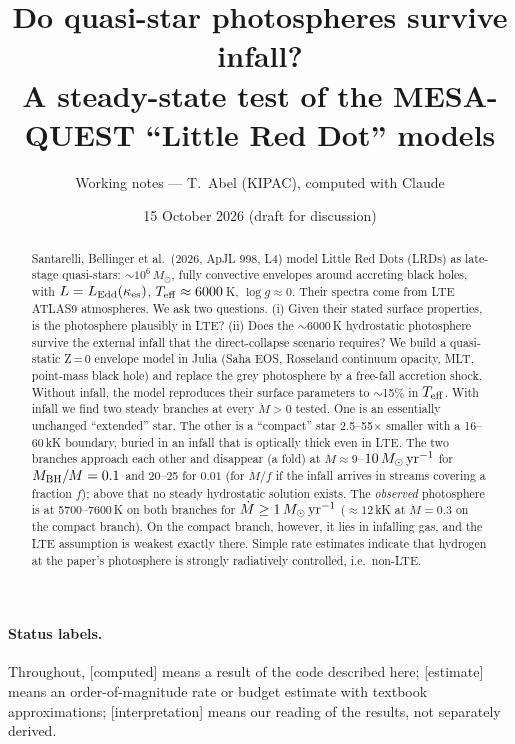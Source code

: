 \documentclass[11pt]{article}
\title{Do quasi-star photospheres survive infall?\\[2pt]
\large A steady-state test of the MESA-QUEST ``Little Red Dot'' models}
\author{Working notes --- T.~Abel (KIPAC), computed with Claude}
\date{15 October 2026 \quad (draft for discussion)}
\newcommand{\Msun}{M_\odot}
\newcommand{\Mdot}{\dot M}
\newcommand{\kes}{\kappa_{\rm es}}
\newcommand{\status}[1]{\textsf{\small\textcolor{black!60}{[#1]}}}
\begin{document}
\maketitle

\begin{abstract}
\noindent
Santarelli, Bellinger et al.\ (2026, ApJL 998, L4) model Little Red Dots (LRDs) as late-stage
quasi-stars: $\sim\!10^6\,\Msun$, fully convective envelopes around accreting black holes, with
$L=L_{\rm Edd}(\kes)$, $T_{\rm eff}\approx6000$\,K, $\log g\approx0$. Their spectra come from LTE ATLAS9 atmospheres.
We ask two questions. (i) Given their stated surface properties, is the photosphere plausibly in LTE?
(ii) Does the $\sim6000$\,K hydrostatic photosphere survive the external infall that the direct-collapse
scenario requires? We build a quasi-static Z\,=\,0 envelope model in Julia (Saha EOS, Rosseland
continuum opacity, MLT, point-mass black hole) and replace the grey photosphere by a free-fall accretion
shock. Without infall, the model reproduces their surface parameters to $\sim$15\% in $T_{\rm eff}$.
With infall we find two steady branches at every $\Mdot>0$ tested. One is an essentially unchanged
``extended'' star. The other is a ``compact'' star 2.5--55$\times$ smaller with a 16--60\,kK boundary, buried in an
infall that is optically thick even in LTE. The two branches approach each other and disappear (a fold) at
$\Mdot\approx9$--$10\,\Msun\,{\rm yr^{-1}}$ for $M_{\rm BH}/M=0.1$ and 20--25 for $0.01$ (for $\Mdot/f$ if the infall
arrives in streams covering a fraction $f$); above that no steady hydrostatic solution exists. The \emph{observed} photosphere is at 5700--7600\,K on both branches for $\Mdot\ge1\,\Msun\,{\rm yr^{-1}}$
($\approx12$\,kK at $\Mdot=0.3$ on the compact branch). On the compact branch, however, it lies in infalling gas,
and the LTE assumption is weakest exactly there. Simple rate estimates indicate that
hydrogen at the paper's photosphere is strongly radiatively controlled, i.e.\ non-LTE.
\end{abstract}

\paragraph{Status labels.} Throughout, \status{computed} means a result of the code described here;
\status{estimate} means an order-of-magnitude rate or budget estimate with textbook approximations;
\status{interpretation} means our reading of the results, not separately derived.
\end{document}
